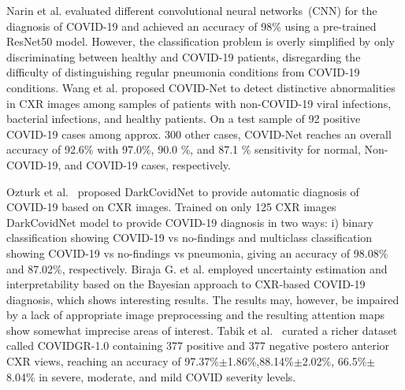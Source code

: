 \documentclass[conference]{IEEEtran}
\begin{document}
Narin et al. \cite{narin2020automatic} evaluated different convolutional neural networks~(CNN) for the diagnosis of COVID-19 and achieved an accuracy of 98\% using a pre-trained ResNet50 model. However, the classification problem is overly simplified by only discriminating between healthy and COVID-19 patients, disregarding the difficulty of distinguishing regular pneumonia conditions from COVID-19 conditions.  
Wang et al. \cite{wang2020covid} proposed COVID-Net to detect distinctive abnormalities in CXR images among samples of patients with non-COVID-19 viral infections, bacterial infections, and healthy patients. 
On a test sample of 92 positive COVID-19 cases among approx. 300 other cases, COVID-Net reaches an overall accuracy of 92.6\% with 97.0\%, 90.0 \%, and 87.1 \% sensitivity for normal, Non-COVID-19, and COVID-19 cases, respectively. 

Ozturk et al.~\cite{ozturk2020automated} proposed DarkCovidNet to provide automatic diagnosis of COVID-19 based on CXR images. Trained on only 125 CXR images DarkCovidNet model to provide COVID-19 diagnosis in two ways: i) binary classification showing COVID-19 vs no-findings and multiclass classification showing COVID-19 vs no-findings vs pneumonia, giving an accuracy of 98.08\% and 87.02\%, 
respectively. %
Biraja G. et al. \cite{ghoshal2020estimating} employed uncertainty estimation and interpretability based on the Bayesian approach to CXR-based COVID-19 diagnosis, which shows interesting results. The results may, however, be impaired by a lack of appropriate image preprocessing and the resulting attention maps show somewhat imprecise areas of interest. Tabik et al.~\cite{tabik2020covidgr} curated a richer dataset called COVIDGR-1.0 containing 377 positive and 377 negative postero anterior CXR views, reaching  
an accuracy of 97.37\%$±$1.86\%,88.14\%$±$2.02\%, 66.5\%$±$8.04\% in severe, moderate, and mild COVID severity levels. 
\end{document}

